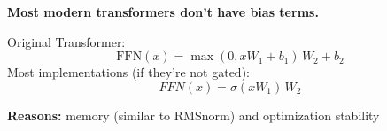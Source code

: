 \textbf{Most modern transformers don't have bias terms.}

\bigskip
Original Transformer:
\[ \text{FFN}(x) = \max(0, xW_1 + b_1)\,W_2 + b_2 \]
Most implementations (if they're not gated):
\[ FFN(x) = \sigma(xW_1)\,W_2 \]
\medskip
{\centering \textbf{Reasons:} memory (similar to RMSnorm) and optimization stability\par}
